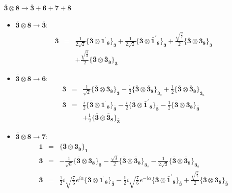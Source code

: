 \documentclass[english]{article}
\newcommand{\subcg}[3]{\big\{ {#1}\otimes{#2}\big\}^{}_{#3}}
\newcommand{\rep}[1]{\mathbf{#1}}
\begin{document}
\paragraph*{\Large $\rep{\bar{3}}\otimes\rep{8}\to\rep{\bar{3}}+\rep{6}+\rep{7}+\rep{8}$}
\begin{itemize}
\item $\rep{\bar{3}}\otimes\rep{8}\to\rep{\bar{3}}$:
\begin{eqnarray*}
\rep{\bar{3}} &=& \frac{1}{2 \sqrt{2}}\subcg{\rep{\bar{3}}}{\rep{1^{\prime}}_{\rep{8}}}{\rep{\bar{3}}}+\frac{1}{2 \sqrt{2}}\subcg{\rep{\bar{3}}}{\rep{\bar{1}^{\prime}}_{\rep{8}}}{\rep{\bar{3}}}+\frac{\sqrt{\frac{3}{2}}}{2}\subcg{\rep{\bar{3}}}{\rep{3}_{\rep{8}}}{\rep{\bar{3}}} \\ 
 & & +\frac{\sqrt{\frac{3}{2}}}{2}\subcg{\rep{\bar{3}}}{\rep{\bar{3}}_{\rep{8}}}{\rep{\bar{3}}}
\end{eqnarray*}
\item $\rep{\bar{3}}\otimes\rep{8}\to\rep{6}$:
\begin{eqnarray*}
\rep{3} &=& \frac{1}{\sqrt{2}}\subcg{\rep{\bar{3}}}{\rep{3}_{\rep{8}}}{\rep{3}}-\frac{1}{2}\subcg{\rep{\bar{3}}}{\rep{\bar{3}}_{\rep{8}}}{\rep{3}_{s}}+\frac{1}{2}\subcg{\rep{\bar{3}}}{\rep{\bar{3}}_{\rep{8}}}{\rep{3}_{a}}
\\
\rep{\bar{3}} &=& \frac{i}{2}\subcg{\rep{\bar{3}}}{\rep{1^{\prime}}_{\rep{8}}}{\rep{\bar{3}}}-\frac{i}{2}\subcg{\rep{\bar{3}}}{\rep{\bar{1}^{\prime}}_{\rep{8}}}{\rep{\bar{3}}}-\frac{1}{2}\subcg{\rep{\bar{3}}}{\rep{3}_{\rep{8}}}{\rep{\bar{3}}} \\ 
 & & +\frac{1}{2}\subcg{\rep{\bar{3}}}{\rep{\bar{3}}_{\rep{8}}}{\rep{\bar{3}}}
\end{eqnarray*}
\item $\rep{\bar{3}}\otimes\rep{8}\to\rep{7}$:
\begin{eqnarray*}
\rep{1} &=& \subcg{\rep{\bar{3}}}{\rep{3}_{\rep{8}}}{\rep{1}}
\\
\rep{3} &=& -\frac{1}{\sqrt{6}}\subcg{\rep{\bar{3}}}{\rep{3}_{\rep{8}}}{\rep{3}}-\frac{\sqrt{3}}{2}\subcg{\rep{\bar{3}}}{\rep{\bar{3}}_{\rep{8}}}{\rep{3}_{s}}-\frac{1}{2 \sqrt{3}}\subcg{\rep{\bar{3}}}{\rep{\bar{3}}_{\rep{8}}}{\rep{3}_{a}}
\\
\rep{\bar{3}} &=& \frac{1}{2} i \sqrt{\frac{7}{6}} e^{i \alpha }\subcg{\rep{\bar{3}}}{\rep{1^{\prime}}_{\rep{8}}}{\rep{\bar{3}}}-\frac{1}{2} i \sqrt{\frac{7}{6}} e^{-i \alpha }\subcg{\rep{\bar{3}}}{\rep{\bar{1}^{\prime}}_{\rep{8}}}{\rep{\bar{3}}}+\frac{\sqrt{\frac{3}{2}}}{2}\subcg{\rep{\bar{3}}}{\rep{3}_{\rep{8}}}{\rep{\bar{3}}} \\ 

\end{eqnarray*}
\end{itemize}
\end{document}
